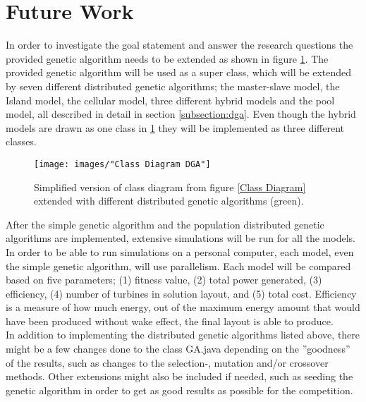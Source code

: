 \section{Future Work}\label{section:futurework}
In order to investigate the goal statement and answer the research questions the provided genetic algorithm needs to be extended as shown in figure \ref{Class Diagram DGA}. The provided genetic algorithm will be used as a super class, which will be extended by seven different distributed genetic algorithms; the master-slave model, the Island model, the cellular model, three different hybrid models and the pool model, all described in detail in section \ref{subsection:dga}. Even though the hybrid models are drawn as one class in \ref{Class Diagram DGA} they will be implemented as three different classes. \\

\begin{figure}[h!]
\begin{center}
\texttt{[image: images/"Class Diagram DGA"]}
\caption{Simplified version of class diagram from figure \ref{Class Diagram} extended with different distributed genetic algorithms (green).}
\label{Class Diagram DGA}
\end{center}
\end{figure}

\noindent After the simple genetic algorithm and the population distributed genetic algorithms are implemented, extensive simulations will be run for all the models. In order to be able to run simulations on a personal computer, each model, even the simple genetic algorithm, will use parallelism. Each model will be compared based on five parameters; (1) fitness value, (2) total power generated, (3) efficiency, (4) number of turbines in solution layout, and (5) total cost. Efficiency is a measure of how much energy, out of the maximum energy amount that would have been produced without wake effect, the final layout is able to produce. \\

\noindent In addition to implementing the distributed genetic algorithms listed above, there might be a few changes done to the class GA.java depending on the ''goodness'' of the results, such as changes to the selection-, mutation and/or crossover methods. Other extensions might also be included if needed, such as seeding the genetic algorithm in order to get as good results as possible for the competition.\\

